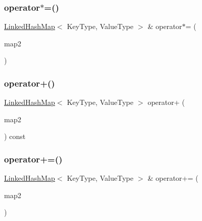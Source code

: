 \mbox{\label{classLinkedHashMap_ae1ab3cc43d53ccab9c73548083ae0ed0}} 
\subsubsection{\texorpdfstring{operator$\ast$=()}{operator*=()}}
{\footnotesize\ttfamily \mbox{\hyperlink{classLinkedHashMap}{Linked\+Hash\+Map}}$<$ Key\+Type, Value\+Type $>$ \& operator$\ast$= (\begin{DoxyParamCaption}\item[{const \mbox{\hyperlink{classLinkedHashMap}{Linked\+Hash\+Map}}$<$ Key\+Type, Value\+Type $>$ \&}]{map2 }\end{DoxyParamCaption})}

\mbox{\label{classLinkedHashMap_a6a85e7e170200435c3beb2e930ca64b2}} 
\subsubsection{\texorpdfstring{operator+()}{operator+()}}
{\footnotesize\ttfamily \mbox{\hyperlink{classLinkedHashMap}{Linked\+Hash\+Map}}$<$ Key\+Type, Value\+Type $>$ operator+ (\begin{DoxyParamCaption}\item[{const \mbox{\hyperlink{classLinkedHashMap}{Linked\+Hash\+Map}}$<$ Key\+Type, Value\+Type $>$ \&}]{map2 }\end{DoxyParamCaption}) const}

\mbox{\label{classLinkedHashMap_a41cb6fea75c4d49ba2c9d3880980a520}} 
\subsubsection{\texorpdfstring{operator+=()}{operator+=()}}
{\footnotesize\ttfamily \mbox{\hyperlink{classLinkedHashMap}{Linked\+Hash\+Map}}$<$ Key\+Type, Value\+Type $>$ \& operator+= (\begin{DoxyParamCaption}\item[{const \mbox{\hyperlink{classLinkedHashMap}{Linked\+Hash\+Map}}$<$ Key\+Type, Value\+Type $>$ \&}]{map2 }\end{DoxyParamCaption})}

